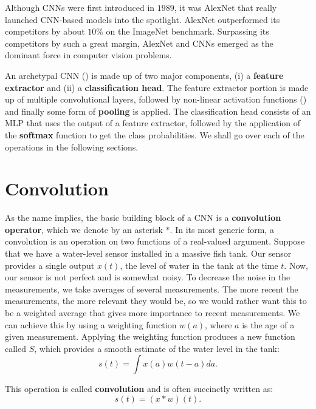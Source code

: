 Although CNNs were first introduced in $1989$, it was AlexNet \parencite{AlexNet2012} that really launched CNN-based models into the spotlight. AlexNet outperformed its competitors by about $10\%$ on the ImageNet \parencite{deng2009imagenet} benchmark. Surpassing its competitors by such a great margin, AlexNet and CNNs emerged as the dominant force in computer vision problems.


An archetypal CNN () is made up of two major components, (i) a \textbf{feature extractor} and (ii) a \textbf{classification head}. The feature extractor portion is made up of multiple convolutional layers, followed by non-linear activation functions () and finally some form of \textbf{pooling} is applied.
The classification head consists of an MLP that uses the output of a feature extractor, followed by the application of the \textbf{softmax} function to get the class probabilities. We shall go over each of the operations in the following sections.


\section{Convolution}\label{sec:convolutions}

As the name implies, the basic building block of a CNN is a \textbf{convolution operator}, which we denote by an asterisk $\ast$. In its most generic form, a convolution is an operation on two functions of a real-valued argument. Suppose that we have a water-level sensor installed in a massive fish tank. Our sensor provides a single output $x(t)$, the level of water in the tank at the time $t$. Now, our sensor is not perfect and is somewhat noisy. 
To decrease the noise in the measurements, we take averages of several measurements. The more recent the measurements, the more relevant they would be, so we would rather want this to be a weighted average that gives more importance to recent measurements.
We can achieve this by using a weighting function $w(a)$, where $a$ is the age of a given measurement. Applying the weighting function produces a new function called $S$, which provides a smooth estimate of the water level in the tank:
\begin{equation}
    \label{eqn:continous-1d-conv}
    s(t)=\int x(a) w(t-a) d a .
\end{equation}

This operation is called \textbf{convolution} and  is often succinctly written as:
\begin{equation}
    \label{eqn:conv-1d-succinct}
    s(t) = (x \ast w)(t).
\end{equation}

